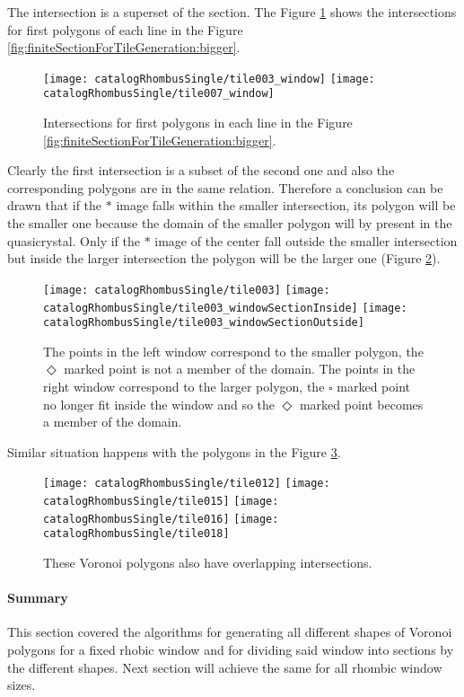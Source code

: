 \documentclass[text.tex]{subfiles}
\begin{document}
The intersection is a superset of the section. The Figure \ref{fig:intersectionsComparison} shows the intersections for first polygons of each line in the Figure \ref{fig:finiteSectionForTileGeneration:bigger}.

\begin{figure}[h!]
\centering
\texttt{[image: catalogRhombusSingle/tile003\_window]}
\texttt{[image: catalogRhombusSingle/tile007\_window]}
\caption{Intersections for first polygons in each line in the Figure \ref{fig:finiteSectionForTileGeneration:bigger}.}
\label{fig:intersectionsComparison}
\end{figure}

Clearly the first intersection is a subset of the second one and also the corresponding polygons are in the same relation. Therefore a conclusion can be drawn that if the $\ast$ image falls within the smaller intersection, its polygon will be the smaller one because the domain of the smaller polygon will by present in the quasicrystal. Only if the $\ast$ image of the center fall outside the smaller intersection but inside the larger intersection the polygon will be the larger one (Figure \ref{fig:intersectionOverlap}).

\begin{figure}[h!]
\centering
\texttt{[image: catalogRhombusSingle/tile003]}
\texttt{[image: catalogRhombusSingle/tile003\_windowSectionInside]}
\texttt{[image: catalogRhombusSingle/tile003\_windowSectionOutside]}
\caption{The points in the left window correspond to the smaller polygon, the {\scriptsize $\Diamond$} marked point is not a member of the domain. The points in the right window correspond to the larger polygon, the {\scriptsize $\square$} marked point no longer fit inside the window and so the {\scriptsize $\Diamond$} marked point becomes a member of the domain.}
\label{fig:intersectionOverlap}
\end{figure}

Similar situation happens with the polygons in the Figure \ref{fig:morePolygonsExample}.

\begin{figure}[h!]
\centering
\texttt{[image: catalogRhombusSingle/tile012]}
\texttt{[image: catalogRhombusSingle/tile015]}
\texttt{[image: catalogRhombusSingle/tile016]}
\texttt{[image: catalogRhombusSingle/tile018]}
\caption{These Voronoi polygons also have overlapping intersections.}
\label{fig:morePolygonsExample}
\end{figure}

\paragraph{Summary}
This section covered the algorithms for generating all different shapes of Voronoi polygons for a fixed rhobic window and for dividing said window into sections by the different shapes. Next section will achieve the same for all rhombic window sizes.
\end{document}
